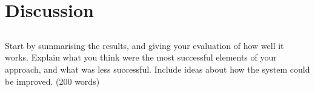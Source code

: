 \section{Discussion}

\subsection{}

Start by summarising the results, and giving your evaluation of how well it works. Explain what you think were the most successful elements of your approach, and what was less successful. Include ideas about how the system could be improved. (200 words)


\subsection{}

\newpage
